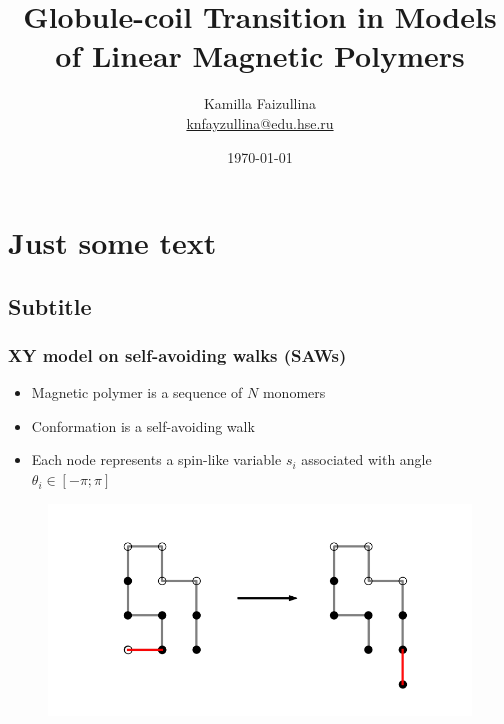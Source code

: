 \documentclass{beamer}
\title[Short title]{Globule-coil Transition in Models of Linear Magnetic Polymers}
\author[Author's name]{Kamilla Faizullina \\ \smallskip \scriptsize \url{knfayzullina@edu.hse.ru}\\\url{  }}
\institute[Higher School of Economics]{National Research University \\ Higher School of Economics (Moscow)}
\date{\today}
\begin{document}

\frame[plain]{\titlepage}	%

\section{Just some text}
\subsection{Subtitle}

\begin{frame}
\frametitle{XY model on self-avoiding walks (SAWs)}
 	\begin{multicols}{2}
  
 		\begin{itemize}
 			\item Magnetic polymer is a sequence of $N$ monomers 
 			\item Conformation is a self-avoiding walk
 			\item Each node represents a spin-like variable $s_i$ associated with angle $\theta_i \in  [-\pi;\pi]$
 		\end{itemize}
   
 	\columnbreak
  
   \begin{figure}[H]
  	\centering
  	\includegraphics[scale=0.3]{snakeupdate.png}
  	\label{fig:example}
  \end{figure}
  
 \end{multicols}
\end{frame}
\end{document}
